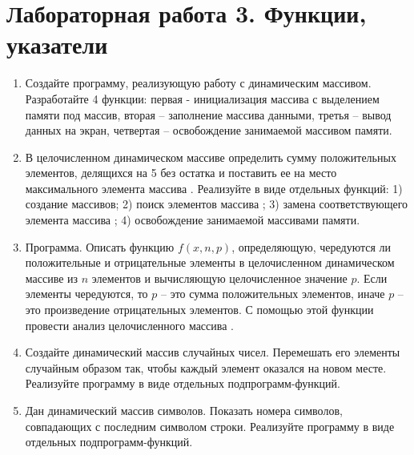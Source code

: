 \section{Лабораторная работа 3. Функции, указатели}
\begin{enumerate}[leftmargin=*]
    \item Создайте программу, реализующую работу с динамическим массивом. Разработайте 4 функции: первая - инициализация массива с выделением памяти под массив, вторая – заполнение массива данными, третья – вывод данных на экран, четвертая – освобождение занимаемой массивом памяти. 
    \item В целочисленном динамическом массиве  определить сумму положительных элементов, делящихся на 5 без остатка и поставить ее на место максимального элемента массива . Реализуйте в виде отдельных функций: 1) создание массивов; 2) поиск элементов массива ; 3) замена соответствующего элемента массива ; 4) освобождение занимаемой массивами памяти.
    \item Программа. Описать функцию $f(x, n, p)$, определяющую, чередуются ли положительные и отрицательные элементы в целочисленном динамическом массиве  из $n$ элементов и вычисляющую целочисленное значение $p$. Если элементы чередуются, то $p$ – это сумма положительных элементов, иначе $p$ – это произведение отрицательных элементов. С помощью этой функции провести анализ целочисленного массива .
    \item Создайте динамический массив случайных чисел. Перемешать его элементы случайным образом так, чтобы каждый элемент оказался на новом месте. Реализуйте программу в виде отдельных подпрограмм-функций.
    \item Дан динамический массив символов. Показать номера символов, совпадающих с последним символом строки. Реализуйте программу в виде отдельных подпрограмм-функций.
\end{enumerate}